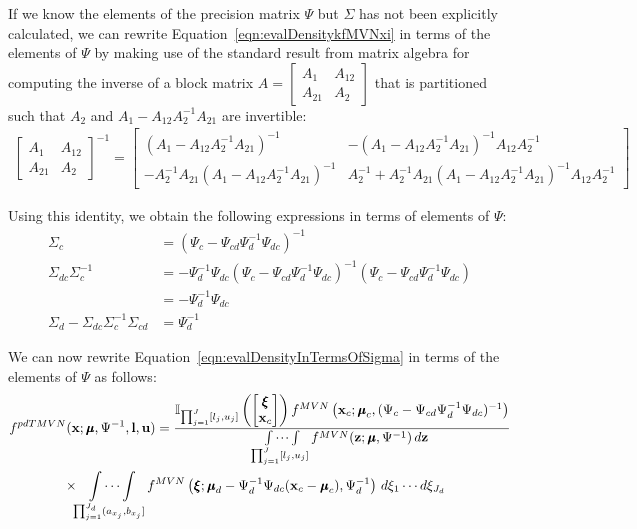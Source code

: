 \documentclass[fleqn]{article}
\newcommand{\ind}{\mathbb{I}}
\begin{document}
If we know the elements of the precision matrix $\Psi$ but $\Sigma$ has not been explicitly calculated, we can rewrite Equation~\eqref{eqn:evalDensitykfMVNxi} in terms of the elements of $\Psi$ by making use of the standard result from matrix algebra for computing the inverse of a block matrix $A = \begin{bmatrix}
A_{1} & A_{12} \\
A_{21} & A_{2}
\end{bmatrix}$ that is partitioned such that $A_2$ and $A_1 - A_{12} A_{2}^{-1} A_{21}$ are invertible:
\begin{align*}
\begin{bmatrix}
A_{1} & A_{12} \\
A_{21} & A_{2}
\end{bmatrix}^{-1} = \begin{bmatrix}
(A_{1} - A_{12} A_2^{-1} A_{21})^{-1} & - (A_{1} - A_{12} A_2^{-1} A_{21})^{-1} A_{12} A_{2}^{-1} \\
- A_{2}^{-1} A_{21} (A_{1} - A_{12} A_2^{-1} A_{21})^{-1} & A_{2}^{-1} + A_{2}^{-1} A_{21} (A_{1} - A_{12} A_2^{-1} A_{21})^{-1} A_{12} A_{2}^{-1}
\end{bmatrix}
\end{align*}

Using this identity, we obtain the following expressions in terms of elements of $\Psi$:
\begin{align*}
\Sigma_c &= (\Psi_c - \Psi_{cd} \Psi_d^{-1} \Psi_{dc})^{-1} \\
\Sigma_{dc} \Sigma_c^{-1} &= - \Psi_d^{-1} \Psi_{dc} (\Psi_c - \Psi_{cd} \Psi_d^{-1} \Psi_{dc})^{-1} (\Psi_c - \Psi_{cd} \Psi_d^{-1} \Psi_{dc}) \\
&= - \Psi_d^{-1} \Psi_{dc} \\
\Sigma_d - \Sigma_{dc} \Sigma_c^{-1} \Sigma_{cd} &= \Psi_{d}^{-1}
\end{align*}

We can now rewrite Equation~\eqref{eqn:evalDensityInTermsOfSigma} in terms of the elements of $\Psi$ as follows:
\begin{align}
&f^{pdTMVN}(\bx ; \bmu, \Psi^{-1}, \bl, \bu) = \frac{\ind_{\prod_{j=1}^J [l_j, u_j]}\left(\begin{bmatrix} \bxi \\ \bx_c \end{bmatrix}\right) f^{MVN}\left(\bx_c; \bmu_c, (\Psi_c - \Psi_{cd} \Psi_d^{-1} \Psi_{dc})^{-1} \right)}{\idotsint\limits_{\prod_{j=1}^J [l_j, u_j]} f^{MVN}(\bz ; \bmu, \Psi^{-1}) \, d \bz } \nonumber \\
&\qquad \qquad \times \idotsint\limits_{\prod_{j=1}^{J_d} (a_{x_j}, b_{x_j}]} f^{MVN}\left(\bxi; \bmu_d - \Psi_d^{-1} \Psi_{dc}(\bx_c - \bmu_c), \Psi_d^{-1} \right) \, d \xi_1 \cdots d \xi_{J_d} \label{eqn:evalDensityInTermsOfPsi}
\end{align}
\end{document}
